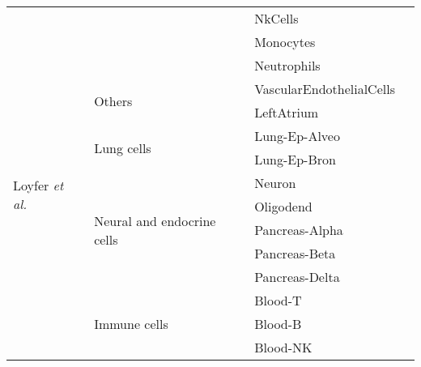 \documentclass[12pt,letterpaper]{article}
\begin{document}
\begin{table}[H]
\begin{center}
\begin{tabular}{|l|l|l|l|}
            \cline{3-4}                             &                                             & NkCells                  &               \\
            \cline{3-4}                             &                                             & Monocytes                &               \\
            \cline{3-4}                             &                                             & Neutrophils              &               \\
            \cline{2-4}                             & \multirow{2}{*}{Others}                     & VascularEndothelialCells &               \\
            \cline{3-4}                             &                                             & LeftAtrium               &               \\
            \hline
            \multirow{6}{*}{Loyfer \textit{et al.}} & \multirow{2}{*}{Lung cells}                 & Lung-Ep-Alveo            &               \\
            \cline{3-4}                             &                                             & Lung-Ep-Bron             &               \\
            \cline{2-4}                             & \multirow{5}{*}{Neural and endocrine cells} & Neuron                   &               \\
            \cline{3-4}                             &                                             & Oligodend                &               \\
            \cline{3-4}                             &                                             & Pancreas-Alpha           &               \\
            \cline{3-4}                             &                                             & Pancreas-Beta            &               \\
            \cline{3-4}                             &                                             & Pancreas-Delta           &               \\
            \cline{2-4}                             & \multirow{5}{*}{Immune cells}               & Blood-T                  &               \\
            \cline{3-4}                             &                                             & Blood-B                  &               \\
            \cline{3-4}                             &                                             & Blood-NK                 &               \\

\end{tabular}
\end{center}
\end{table}
\end{document}
